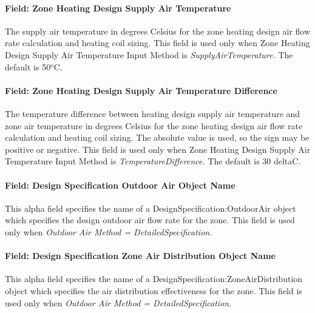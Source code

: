 \paragraph{Field: Zone Heating Design Supply Air Temperature}\label{field-zone-heating-design-supply-air-temperature-1}

The supply air temperature in degrees Celsius for the zone heating design air flow rate calculation and heating coil sizing. This field is used only when Zone Heating Design Supply Air Temperature Input Method is \emph{SupplyAirTemperature.} The default is 50\(^{o}\)C.

\paragraph{Field: Zone Heating Design Supply Air Temperature Difference}\label{field-zone-heating-design-supply-air-temperature-difference-2}

The temperature difference between heating design supply air temperature and zone air temperature in degrees Celsius for the zone heating design air flow rate calculation and heating coil sizing. The absolute value is used, so the sign may be positive or negative. This field is used only when Zone Heating Design Supply Air Temperature Input Method is \emph{TemperatureDifference.} The default is 30 deltaC.

\paragraph{Field: Design Specification Outdoor Air Object Name}\label{field-design-specification-outdoor-air-object-name-4}

This alpha field specifies the name of a DesignSpecification:OutdoorAir object which specifies the design outdoor air flow rate for the zone. This field is used only when \emph{Outdoor Air Method = DetailedSpecification}.

\paragraph{Field: Design Specification Zone Air Distribution Object Name}\label{field-design-specification-zone-air-distribution-object-name-3}

This alpha field specifies the name of a DesignSpecification:ZoneAirDistribution object which specifies the air distribution effectiveness for the zone. This field is used only when \emph{Outdoor Air Method = DetailedSpecification}.

